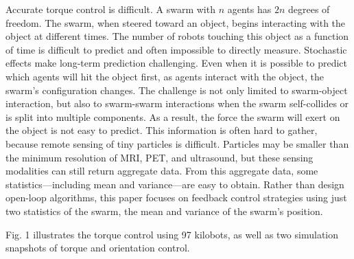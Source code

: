Accurate torque control is difficult.
A swarm with $n$ agents has $2n$ degrees of freedom.  
The swarm, when steered toward an object, begins interacting with the object at different times. 
The number of robots touching this object as a function of time is difficult to predict and often impossible to directly measure.
Stochastic effects make long-term prediction challenging.
Even when it is possible to predict which agents will hit the object first, as agents interact with the object, the swarm's configuration changes.
The challenge is not only limited to swarm-object interaction, but also to swarm-swarm interactions when the swarm self-collides  or is split into multiple components. 
As a result, the force the swarm will exert on the object is not easy to predict.
This information is often hard to gather, because remote sensing of tiny particles is difficult.
Particles may be smaller than the minimum resolution of MRI, PET, and ultrasound, but these sensing modalities can still return aggregate data.
From this aggregate data,  some statistics---including mean and variance---are easy to obtain. 
Rather than design open-loop algorithms, this paper focuses on feedback control strategies using just two statistics of the swarm, the mean and variance of the swarm's position.


Fig. 1 illustrates the torque control using 97 kilobots, as well as two simulation snapshots of torque and orientation control.




